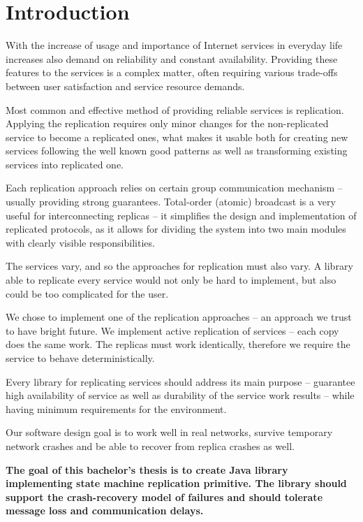 
\chapter{Introduction}

With the increase of usage and importance of Internet services in everyday life increases also demand on reliability and constant availability.
Providing these features to the services is a complex matter, often requiring various trade-offs between user satisfaction and service resource demands.

Most common and effective method of providing reliable services is replication. Applying the replication requires only minor changes for the non-replicated service to become a replicated ones, what makes it usable both for creating new services following the well known good patterns as well as transforming existing services into replicated one.

Each replication approach relies on certain group communication mechanism -- usually providing strong guarantees. Total-order (atomic) broadcast is a very useful for interconnecting replicas -- it simplifies the design and implementation of replicated protocols, as it allows for dividing the system into two main modules with clearly visible responsibilities.

The services vary, and so the approaches for replication must also vary. A library able to replicate every service would not only be hard to implement, but also could be too complicated for the user.

We chose to implement one of the replication approaches -- an approach we trust to have bright future.
We implement active replication of services -- each copy does the same work. The replicas must work identically, therefore we require the service to behave deterministically.

Every library for replicating services should address its main purpose -- guarantee high availability of service as well as durability of the service work results -- while having minimum requirements for the environment.

Our software design goal is to work well in real networks, survive temporary network crashes and be able to recover from replica crashes as well.

{
\bfseries
The goal of this bachelor's thesis is to create Java library implementing state machine replication primitive. The library should support the crash-recovery model of failures and should tolerate message loss and communication delays.
}

